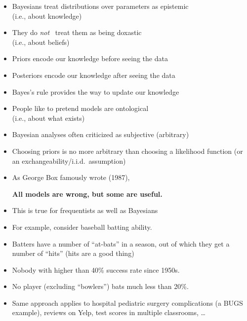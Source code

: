\documentclass[10pt]{report}
\begin{document}
\begin{itemize}
\item Bayesians treat distributions over parameters as epistemic \\
(i.e., about knowledge) 
\item They do \emph{not} \ treat them as being doxastic \\
(i.e., about beliefs)
\item Priors encode our knowledge before seeing the data
\item Posteriors encode our knowledge after seeing the data
\item Bayes's rule provides the way to update our knowledge
\item People like to pretend models are ontological \\
(i.e., about what exists)
\end{itemize}

\begin{itemize}
\item Bayesian analyses often criticized as subjective (arbitrary)
\item Choosing priors is no more arbitrary than choosing a likelihood
  function (or an exchangeability/i.i.d.\ assumption)
\item As George Box famously wrote (1987),
\begin{center}
\large
{\bfseries All models are wrong, but some are useful.}
\end{center}
\item This is true for frequentists as well as Bayesians
\end{itemize}



\begin{itemize}
\item For example, consider baseball batting ability.
\item Batters have a number of ``at-bats'' in a season, out of which they
  get a number of ``hits'' (hits are a good thing)
\item Nobody with higher than 40\% success rate since 1950s.
\item No player (excluding ``bowlers'') bats much less than 20\%.
\item Same approach applies to hospital pediatric surgery
  complications (a BUGS example), reviews on Yelp,
  test scores in multiple classrooms, \ldots
\end{itemize}
\end{document}
